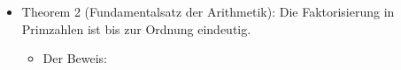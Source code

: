 \documentclass[a4paper]{article}
\begin{document}
\begin{multicols}{3}
\begin{itemize}
              \begin{itemize}
                  \item
                        Der Beweis: Es sei \$p\textbar(a\textbackslash times b)\$

                        \begin{itemize}
                            \item
                                  Wenn \$p\textbar a\$ dann sind wir fertig.
                            \item
                                  Wenn nicht, dann \$gcd(p,a) = 1
                                  \textbackslash Rightarrow\textbackslash exists m,
                                  n\textbackslash in\textbackslash mathbb\{N\}:1=m\textbackslash times
                                  p+n\textbackslash times a \textbackslash Leftrightarrow
                                  b=m\textbackslash times p \textbackslash times b + n
                                  \textbackslash times a \textbackslash times b\$
                            \item
                                  Da \$p\textbar(a\textbackslash times b)\$, teilt p beide Summanden
                                  der Gleichung und somit auch die Summe, die b ist
                        \end{itemize}
              \end{itemize}
        \item
              Theorem 2 (Fundamentalsatz der Arithmetik): Die Faktorisierung in
              Primzahlen ist bis zur Ordnung eindeutig.

              \begin{itemize}
                  \item
                        Der Beweis:


\end{itemize}
\end{itemize}
\end{multicols}
\end{document}
